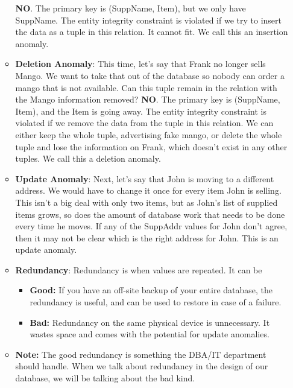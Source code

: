 \documentclass{report}
\begin{document}
\begin{itemize}
\begin{itemize}
                    \bigbreak \noindent 
                    \textbf{NO}. The primary key is (SuppName, Item), but we only have SuppName. The entity integrity constraint is violated if we try to insert the data as a tuple in this relation. It cannot fit. We call this an insertion anomaly.
                \item \textbf{Deletion Anomaly}: This time, let's say that Frank no longer sells Mango. We want to take that out of the database so nobody can order a mango that is not available. Can this tuple remain in the relation with the Mango information removed?
                    \bigbreak \noindent 
                    \textbf{NO}. The primary key is (SuppName, Item), and the Item is going away. The entity integrity constraint is violated if we remove the data from the tuple in this relation. We can either keep the whole tuple, advertising fake mango, or delete the whole tuple and lose the information on Frank, which doesn't exist in any other tuples. We call this a deletion anomaly.
                \item \textbf{Update Anomaly}: Next, let's say that John is moving to a different address. We would have to change it once for every item John is selling. This isn't a big deal with only two items, but as John's list of supplied items grows, so does the amount of database work that needs to be done every time he moves. If any of the SuppAddr values for John don't agree, then it may not be clear which is the right address for John. This is an update anomaly.
                \item \textbf{Redundancy}: Redundancy is when values are repeated.
                    \bigbreak \noindent 
                    It can be
                    \begin{itemize}
                        \item \textbf{Good:} If you have an off-site backup of your entire database, the redundancy is useful, and can be used to restore in case of a failure.
                        \item \textbf{Bad:} Redundancy on the same physical device is unnecessary. It wastes space and comes with the potential for update anomalies.
                    \end{itemize}
                \item \textbf{Note:} The good redundancy is something the DBA/IT department should handle. When we talk about redundancy in the design of our database, we will be talking about the bad kind.
            \end{itemize}

\end{itemize}
\end{document}
